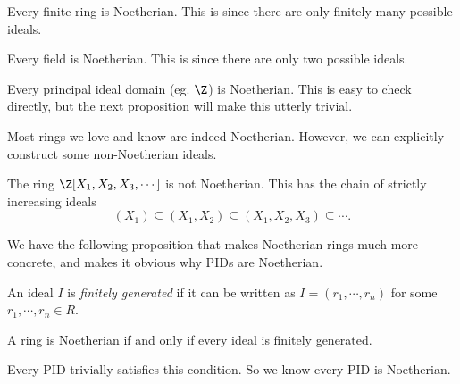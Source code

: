 \documentclass[a4paper]{article}
\begin{document}
\begin{eg}
  Every finite ring is Noetherian. This is since there are only finitely many possible ideals.
\end{eg}

\begin{eg}
  Every field is Noetherian. This is since there are only two possible ideals.
\end{eg}

\begin{eg}
  Every principal ideal domain (eg. $\Z$) is Noetherian. This is easy to check directly, but the next proposition will make this utterly trivial.
\end{eg}

Most rings we love and know are indeed Noetherian. However, we can explicitly construct some non-Noetherian ideals.
\begin{eg}
  The ring $\Z[X_1, X_2, X_3, \cdots]$ is not Noetherian. This has the chain of strictly increasing ideals
  \[
    (X_1) \subseteq (X_1, X_2) \subseteq (X_1, X_2, X_3) \subseteq \cdots.
  \]
\end{eg}

We have the following proposition that makes Noetherian rings much more concrete, and makes it obvious why PIDs are Noetherian.

\begin{defi}
  An ideal $I$ is \emph{finitely generated} if it can be written as $I = (r_1, \cdots, r_n)$ for some $r_1, \cdots, r_n \in R$.
\end{defi}

\begin{prop}
  A ring is Noetherian if and only if every ideal is finitely generated.
\end{prop}
Every PID trivially satisfies this condition. So we know every PID is Noetherian.
\end{document}
